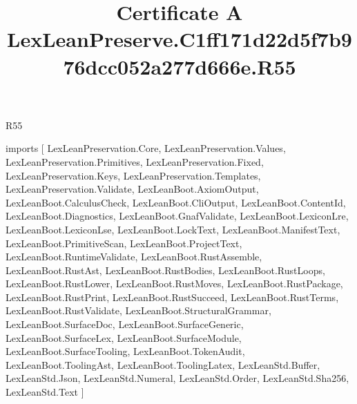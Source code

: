 \begin{lexlean}{R55}
\title{Certificate A LexLeanPreserve.C1ff171d22d5f7b976dcc052a277d666e.R55}
\begin{coremodule}
imports [
  LexLeanPreservation.Core,
  LexLeanPreservation.Values,
  LexLeanPreservation.Primitives,
  LexLeanPreservation.Fixed,
  LexLeanPreservation.Keys,
  LexLeanPreservation.Templates,
  LexLeanPreservation.Validate,
  LexLeanBoot.AxiomOutput,
  LexLeanBoot.CalculusCheck,
  LexLeanBoot.CliOutput,
  LexLeanBoot.ContentId,
  LexLeanBoot.Diagnostics,
  LexLeanBoot.GnafValidate,
  LexLeanBoot.LexiconLre,
  LexLeanBoot.LexiconLse,
  LexLeanBoot.LockText,
  LexLeanBoot.ManifestText,
  LexLeanBoot.PrimitiveScan,
  LexLeanBoot.ProjectText,
  LexLeanBoot.RuntimeValidate,
  LexLeanBoot.RustAssemble,
  LexLeanBoot.RustAst,
  LexLeanBoot.RustBodies,
  LexLeanBoot.RustLoops,
  LexLeanBoot.RustLower,
  LexLeanBoot.RustMoves,
  LexLeanBoot.RustPackage,
  LexLeanBoot.RustPrint,
  LexLeanBoot.RustSucceed,
  LexLeanBoot.RustTerms,
  LexLeanBoot.RustValidate,
  LexLeanBoot.StructuralGrammar,
  LexLeanBoot.SurfaceDoc,
  LexLeanBoot.SurfaceGeneric,
  LexLeanBoot.SurfaceLex,
  LexLeanBoot.SurfaceModule,
  LexLeanBoot.SurfaceTooling,
  LexLeanBoot.TokenAudit,
  LexLeanBoot.ToolingAst,
  LexLeanBoot.ToolingLatex,
  LexLeanStd.Buffer,
  LexLeanStd.Json,
  LexLeanStd.Numeral,
  LexLeanStd.Order,
  LexLeanStd.Sha256,
  LexLeanStd.Text
]


\end{coremodule}
\end{lexlean}
